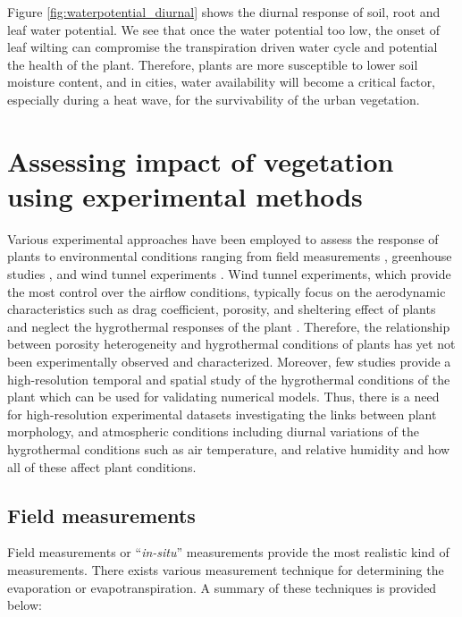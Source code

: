 Figure \ref{fig:waterpotential_diurnal} shows the diurnal response of soil, root and leaf water potential. We see that once the water potential too low, the onset of leaf wilting can compromise the transpiration driven water cycle and potential the health of the plant. Therefore, plants are more susceptible to lower soil moisture content, and in cities, water availability will become a critical factor, especially during a heat wave, for the survivability of the urban vegetation. 

%
%
%


\section{Assessing impact of vegetation using experimental methods}

Various experimental approaches have been employed to assess the response of plants to environmental conditions ranging from field measurements \citep{Dellwik2019,Grant1998,Hagishima2007,Koizumi2016,Shashua-Bar2009b,Shashua-Bar2000a,Yuan2017}, greenhouse studies \citep{Fatnassi2006,Ganguly2009,Majdoubi2009,Montero2001}, and wind tunnel experiments \citep{Grace1977,Liu2018,Manickathan2018b,Miri2019,Rudnicki2004,Vollsinger2005,Yue2008}. Wind tunnel experiments, which provide the most control over the airflow conditions, typically focus on the aerodynamic characteristics such as drag coefficient, porosity, and sheltering effect of plants and neglect the hygrothermal responses of the plant \citep{Grace1977,Manickathan2018b}. Therefore, the relationship between porosity heterogeneity and hygrothermal conditions of plants has yet not been experimentally observed and characterized. Moreover, few studies provide a high-resolution temporal and spatial study of the hygrothermal conditions of the plant which can be used for validating numerical models. Thus, there is a need for high-resolution experimental datasets investigating the links between plant morphology, and atmospheric conditions including diurnal variations of the hygrothermal conditions such as air temperature, and relative humidity and how all of these affect plant conditions. 

\subsection{Field measurements}
Field measurements or ``\textit{in-situ}'' measurements provide the most realistic kind of measurements. There exists various measurement technique for determining the evaporation or evapotranspiration. A summary of these techniques is provided below:

